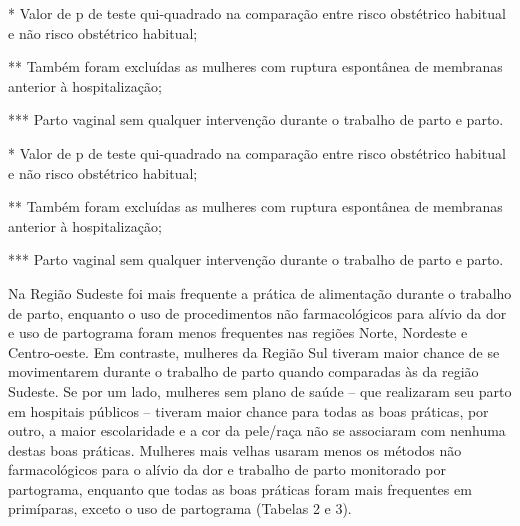 \documentclass{article}
\begin{document}
* Valor de p de teste qui-quadrado na comparação entre risco
obstétrico habitual e não risco obstétrico habitual;

** Também foram excluídas as mulheres com ruptura espontânea de
membranas anterior à hospitalização;

*** Parto vaginal sem qualquer intervenção durante o trabalho de
parto e parto.

* Valor de p de teste qui-quadrado na comparação entre risco
obstétrico habitual e não risco obstétrico habitual;

** Também foram excluídas as mulheres com ruptura espontânea de
membranas anterior à hospitalização;

*** Parto vaginal sem qualquer intervenção durante o trabalho de
parto e parto.

Na Região Sudeste foi mais frequente a prática de alimentação durante o trabalho
de
parto, enquanto o uso de procedimentos não farmacológicos para alívio da dor e
uso
de partograma foram menos frequentes nas regiões Norte, Nordeste e Centro-oeste.
Em
contraste, mulheres da Região Sul tiveram maior chance de se movimentarem
durante o
trabalho de parto quando comparadas às da região Sudeste. Se por um lado,
mulheres
sem plano de saúde – que realizaram seu parto em hospitais públicos – tiveram
maior
chance para todas as boas práticas, por outro, a maior escolaridade e a cor da
pele/raça não se associaram com nenhuma destas boas práticas. Mulheres mais
velhas
usaram menos os métodos não farmacológicos para o alívio da dor e trabalho de
parto
monitorado por partograma, enquanto que todas as boas práticas foram mais
frequentes
em primíparas, exceto o uso de partograma (Tabelas
2 e 3).
\end{document}
